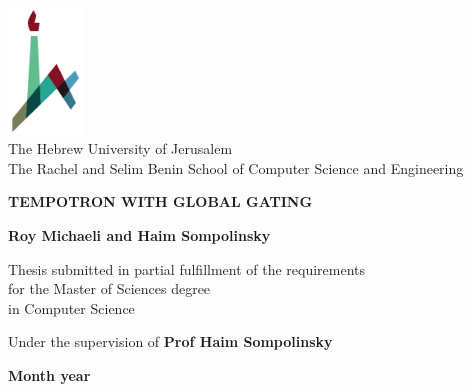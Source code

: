 \begin{titlepage}
    \begin{center}
        \vspace*{1cm}
        
        \includegraphics[width=0.15\textwidth]{huji_logo_notext.pdf}\\
        The Hebrew University of Jerusalem\\
        The Rachel and Selim Benin School of Computer Science and Engineering
        
        \vspace{2cm}
        
        {\Large \textbf{TEMPOTRON WITH GLOBAL GATING }}
        
        
        \textbf{Roy Michaeli and Haim Sompolinsky}
        
        \vspace{1cm}
        
        Thesis submitted in partial fulfillment of the requirements\\for the Master of Sciences degree\\
        in Computer Science
        
        \vspace{1cm}
        
        Under the supervision of \textbf{Prof Haim Sompolinsky}
        
        \vfill
        
        \textbf{Month year}
    \end{center}
\end{titlepage}